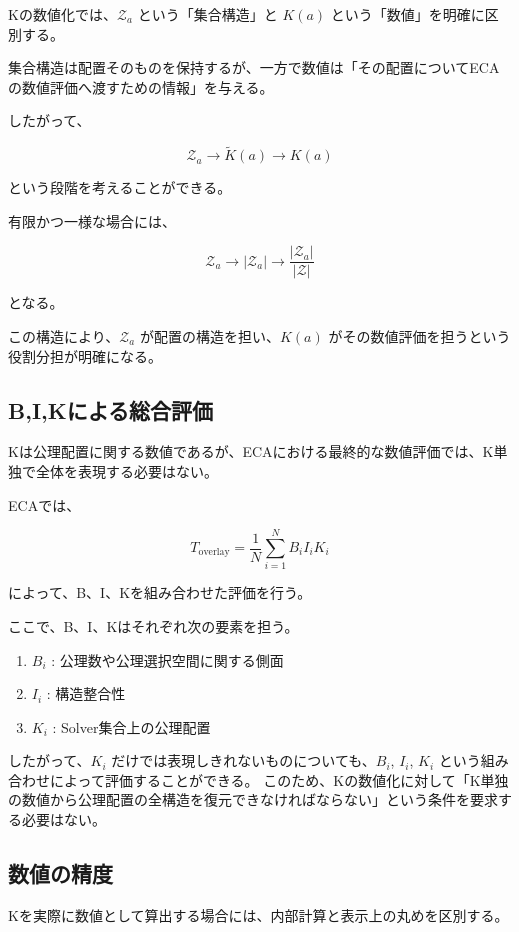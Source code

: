 Kの数値化では、$\mathcal{Z}_a$ という「集合構造」と $K(a)$ という「数値」を明確に区別する。

集合構造は配置そのものを保持するが、一方で数値は「その配置についてECAの数値評価へ渡すための情報」を与える。

したがって、

\[
\mathcal{Z}_a
\longrightarrow
\widetilde{K}(a)
\longrightarrow
K(a)
\]

という段階を考えることができる。

有限かつ一様な場合には、

\[
\mathcal{Z}_a
\longrightarrow
|\mathcal{Z}_a|
\longrightarrow
\frac{|\mathcal{Z}_a|}{|\mathcal{Z}|}
\]

となる。

この構造により、$\mathcal{Z}_a$ が配置の構造を担い、$K(a)$ がその数値評価を担うという役割分担が明確になる。

\subsection{B,I,Kによる総合評価}

Kは公理配置に関する数値であるが、ECAにおける最終的な数値評価では、K単独で全体を表現する必要はない。

ECAでは、

\[
T_{\mathrm{overlay}} = \frac{1}{N}\sum_{i=1}^{N}B_iI_iK_i
\]

によって、B、I、Kを組み合わせた評価を行う。

ここで、B、I、Kはそれぞれ次の要素を担う。

\begin{enumerate}
  \item $B_i$ : 公理数や公理選択空間に関する側面
  \item $I_i$ : 構造整合性
  \item $K_i$ : Solver集合上の公理配置
\end{enumerate}

したがって、$K_i$ だけでは表現しきれないものについても、$B_i$, $I_i$, $K_i$ という組み合わせによって評価することができる。
このため、Kの数値化に対して「K単独の数値から公理配置の全構造を復元できなければならない」という条件を要求する必要はない。

\subsection{数値の精度}

Kを実際に数値として算出する場合には、内部計算と表示上の丸めを区別する。

